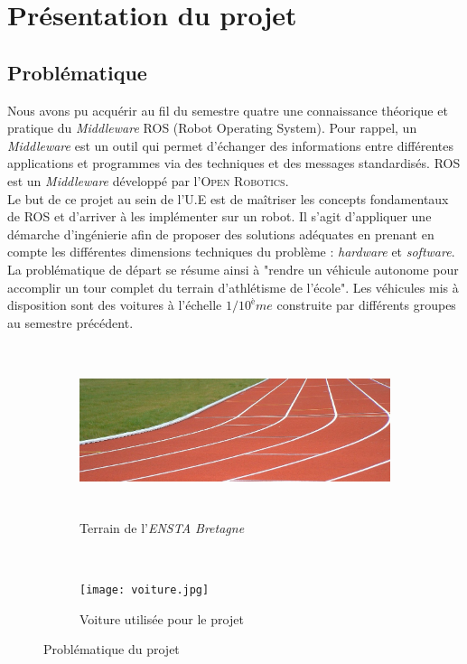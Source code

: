 \documentclass[12pt, openany]{report}
\begin{document}
\pagebreak

\section{Présentation du projet}
\subsection{Problématique}
Nous avons pu acquérir au fil du semestre quatre une connaissance théorique et pratique du \textit{Middleware} \textsc{ROS} (Robot Operating System). Pour rappel, un \textit{Middleware} est un outil qui permet d'échanger des informations entre différentes applications et programmes via des techniques et des messages standardisés. \textsc{ROS} est un \textit{Middleware} développé par l'\textsc{Open Robotics}.\\

Le but de ce projet au sein de l'U.E est de maîtriser les concepts fondamentaux de \textsc{ROS} et d'arriver à les implémenter sur un robot. Il s'agit d'appliquer une démarche d'ingénierie afin de proposer des solutions adéquates en prenant en compte les différentes dimensions techniques du problème : \textit{hardware} et \textit{software}.\\

La problématique de départ se résume ainsi à "rendre un véhicule autonome pour accomplir un tour complet du terrain d'athlétisme de l'école". Les véhicules mis à disposition sont des voitures à l'échelle $1/10^ème$ construite par différents groupes au semestre précédent.

\begin{figure}[!h]
     \centering
     \begin{subfigure}[b]{0.45\textwidth}
         \centering
         \includegraphics[width=\textwidth, height = 5cm]{terrain.jpg}
         \caption{Terrain de l'\textit{ENSTA Bretagne}}
     \end{subfigure}
     ~
     \begin{subfigure}[b]{0.45\textwidth}
         \centering
         \texttt{[image: voiture.jpg]}
         \caption{Voiture utilisée pour le projet}
     \end{subfigure}
     \caption{Problématique du projet}
     \label{fig:prob}
\end{figure}
\end{document}
